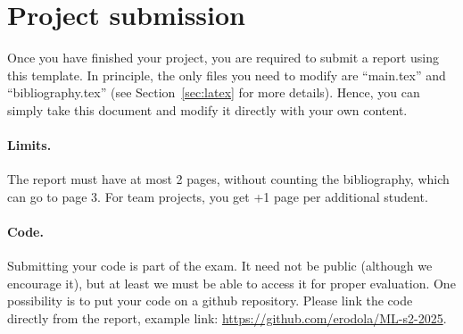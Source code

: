 \documentclass{article}
\begin{document}

\printAffiliationsAndNotice{}

\begin{abstract}
%
This is a \LaTeX template for writing your project report, to be submitted as part of the final exam. The template can not be modified (you can not change margins, spaces, etc.), and using this template is mandatory. Please read the main text for further details.
%
\end{abstract}

\section{Project submission}

Once you have finished your project, you are required to submit a report using this template. In principle, the only files you need to modify are ``main.tex'' and ``bibliography.tex'' (see Section~\ref{sec:latex} for more details). Hence, you can simply take this document and modify it directly with your own content.

\paragraph*{Limits.}
The report must have at most 2 pages, without counting the bibliography, which can go to page 3. For team projects, you get +1 page per additional student.

\paragraph*{Code.} 
Submitting your code is part of the exam. It need not be public (although we encourage it), but at least we must be able to access it for proper evaluation. One possibility is to put your code on a github repository. Please link the code directly from the report, example link: \url{https://github.com/erodola/ML-s2-2025}.
\end{document}
